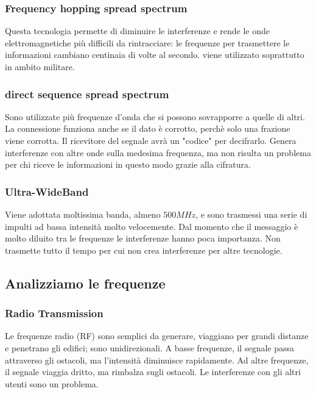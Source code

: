 \documentclass{article}
\begin{document}
\subsubsection{Frequency hopping spread spectrum}
Questa tecnologia permette di diminuire le interferenze e rende le onde
elettromagnetiche più difficili da rintracciare: le frequenze per trasmettere le
informazioni cambiano centinaia di volte al secondo. viene utilizzato
soprattutto in ambito militare.

\subsubsection{direct sequence spread spectrum}
Sono utilizzate più frequenze d'onda che si possono sovrapporre a quelle di
altri. La connessione funziona anche se il dato è corrotto, perchè solo una
frazione viene corrotta. Il ricevitore del segnale avrà un "codice" per
decifrarlo. Genera interferenze con altre onde sulla medesima frequenza, ma non
risulta un problema per chi riceve le informazioni in questo modo grazie alla
cifratura.

\subsubsection{Ultra-WideBand}
Viene adottata moltissima banda, almeno $500MHz$, e sono trasmessi una serie di
impulti ad bassa intensità molto velocemente. Dal momento che il messaggio è
molto diluito tra le frequenze le interferenze hanno poca importanza. Non
trasmette tutto il tempo per cui non crea interferenze per altre tecnologie. 

\subsection{Analizziamo le frequenze}

\subsubsection{Radio Transmission}
Le frequenze radio (RF) sono semplici da generare, viaggiano per grandi distanze
e penetrano gli edifici; sono unidirezionali. A basse frequenze, il segnale
passa attraverso gli ostacoli, ma l'intensità diminuisce rapidamente. Ad altre
frequenze, il segnale viaggia dritto, ma rimbalza sugli ostacoli. Le
interferenze con gli altri utenti sono un problema. 
\end{document}
